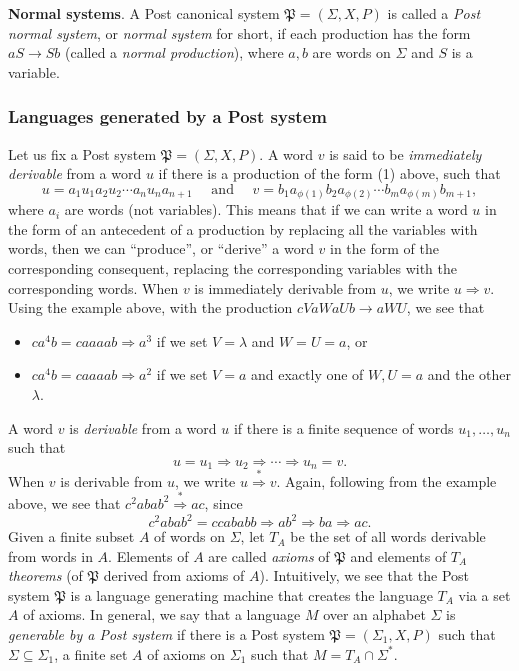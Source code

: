 \documentclass[12pt]{article}
\newcommand{\derive}{\stackrel{*}{\Rightarrow}}
\begin{document}
\textbf{Normal systems}.  A Post canonical system $\mathfrak{P}=(\Sigma,X,P)$ is called a \emph{Post normal system}, or \emph{normal system} for short, if each production has the form $aS\to Sb$ (called a \emph{normal production}), where $a,b$ are words on $\Sigma$ and $S$ is a variable.

\subsubsection*{Languages generated by a Post system}  

Let us fix a Post system $\mathfrak{P}=(\Sigma,X,P)$.  A word $v$ is said to be \emph{immediately derivable} from a word $u$ if there is a production of the form (1) above, such that $$u=a_1u_1a_2u_2\cdots a_nu_na_{n+1} \quad\mbox{ and }\quad v=b_1a_{\phi(1)}b_2a_{\phi(2)}\cdots b_ma_{\phi(m)}b_{m+1},$$ where $a_i$ are words (not variables).  This means that if we can write a word $u$ in the form of an antecedent of a production by replacing all the variables with words, then we can ``produce'', or ``derive'' a word $v$ in the form of the corresponding consequent, replacing the corresponding variables with the corresponding words.  When $v$ is immediately derivable from $u$, we write $u\Rightarrow v$.  Using the example above, with the production $cVaWaUb\to aWU$, we see that 
\begin{itemize}
\item $ca^4b=caaaab\Rightarrow a^3$ if we set $V=\lambda$ and $W=U=a$, or 
\item $ca^4b=caaaab\Rightarrow a^2$ if we set $V=a$ and exactly one of $W,U=a$ and the other $\lambda$.
\end{itemize}
A word $v$ is \emph{derivable} from a word $u$ if there is a finite sequence of words $u_1,\ldots,u_n$ such that $$u=u_1\Rightarrow u_2\Rightarrow \cdots \Rightarrow u_n=v.$$  When $v$ is derivable from $u$, we write $u\derive v$.  Again, following from the example above, we see that $c^2abab^2\derive ac$, since $$c^2abab^2=ccababb \Rightarrow ab^2 \Rightarrow ba \Rightarrow ac.$$
Given a finite subset $A$ of words on $\Sigma$, let $T_A$ be the set of all words derivable from words in $A$.  Elements of $A$ are called \emph{axioms} of $\mathfrak{P}$ and elements of $T_A$ \emph{theorems} (of $\mathfrak{P}$ derived from axioms of $A$).  Intuitively, we see that the Post system $\mathfrak{P}$ is a language generating machine that creates the language $T_A$ via a set $A$ of axioms.  In general, we say that a language $M$ over an alphabet $\Sigma$ is \emph{generable by a Post system} if there is a Post system $\mathfrak{P}=(\Sigma_1, X,P)$ such that $\Sigma\subseteq \Sigma_1$, a finite set $A$ of axioms on $\Sigma_1$ such that $M=T_A\cap \Sigma^*$.
\end{document}
